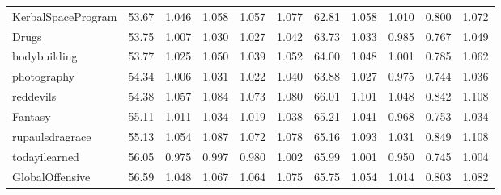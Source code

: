 \begin{tabular}{lrrrrrrrrrr}
KerbalSpaceProgram  &         53.67 &               1.046 &               1.058 &               1.057 &               1.077 &                62.81 &                      1.058 &                      1.010 &                      0.800 &                      1.072 \\
Drugs               &         53.75 &               1.007 &               1.030 &               1.027 &               1.042 &                63.73 &                      1.033 &                      0.985 &                      0.767 &                      1.049 \\
bodybuilding        &         53.77 &               1.025 &               1.050 &               1.039 &               1.052 &                64.00 &                      1.048 &                      1.001 &                      0.785 &                      1.062 \\
photography         &         54.34 &               1.006 &               1.031 &               1.022 &               1.040 &                63.88 &                      1.027 &                      0.975 &                      0.744 &                      1.036 \\
reddevils           &         54.38 &               1.057 &               1.084 &               1.073 &               1.080 &                66.01 &                      1.101 &                      1.048 &                      0.842 &                      1.108 \\
Fantasy             &         55.11 &               1.011 &               1.034 &               1.019 &               1.038 &                65.21 &                      1.041 &                      0.968 &                      0.753 &                      1.034 \\
rupaulsdragrace     &         55.13 &               1.054 &               1.087 &               1.072 &               1.078 &                65.16 &                      1.093 &                      1.031 &                      0.849 &                      1.108 \\
todayilearned       &         56.05 &               0.975 &               0.997 &               0.980 &               1.002 &                65.99 &                      1.001 &                      0.950 &                      0.745 &                      1.004 \\
GlobalOffensive     &         56.59 &               1.048 &               1.067 &               1.064 &               1.075 &                65.75 &                      1.054 &                      1.014 &                      0.803 &                      1.082 \\

\end{tabular}

